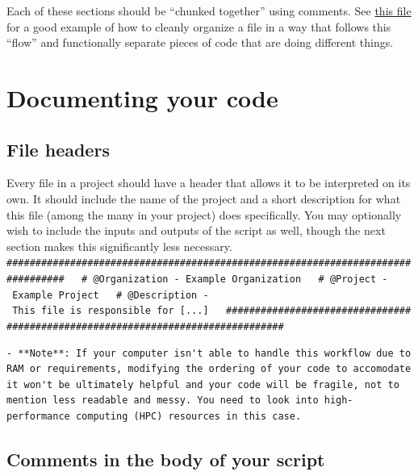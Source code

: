 \documentclass[]{book}
\begin{document}
Each of these sections should be ``chunked together'' using comments. See \href{https://github.com/kmishra9/Flu-Absenteeism/blob/master/Master's\%20Thesis\%20-\%20Spatial\%20Epidemiology\%20of\%20Influenza/2a\%20-\%20Statistical-Inputs.R}{this file} for a good example of how to cleanly organize a file in a way that follows this ``flow'' and functionally separate pieces of code that are doing different things.

\hypertarget{documenting-your-code}{%
\section{Documenting your code}\label{documenting-your-code}}

\hypertarget{file-headers}{%
\subsection{File headers}\label{file-headers}}

Every file in a project should have a header that allows it to be interpreted on its own. It should include the name of the project and a short description for what this file (among the many in your project) does specifically. You may optionally wish to include the inputs and outputs of the script as well, though the next section makes this significantly less necessary.
\texttt{\#\#\#\#\#\#\#\#\#\#\#\#\#\#\#\#\#\#\#\#\#\#\#\#\#\#\#\#\#\#\#\#\#\#\#\#\#\#\#\#\#\#\#\#\#\#\#\#\#\#\#\#\#\#\#\#\#\#\#\#\#\#\#\#\#\#\#\#\#\#\#\#\#\#\#\#\#\#\#\#\ \ \ \#\ @Organization\ -\ Example\ Organization\ \ \ \#\ @Project\ -\ Example\ Project\ \ \ \#\ @Description\ -\ This\ file\ is\ responsible\ for\ {[}...{]}\ \ \ \#\#\#\#\#\#\#\#\#\#\#\#\#\#\#\#\#\#\#\#\#\#\#\#\#\#\#\#\#\#\#\#\#\#\#\#\#\#\#\#\#\#\#\#\#\#\#\#\#\#\#\#\#\#\#\#\#\#\#\#\#\#\#\#\#\#\#\#\#\#\#\#\#\#\#\#\#\#\#\#}

\begin{verbatim}
- **Note**: If your computer isn't able to handle this workflow due to RAM or requirements, modifying the ordering of your code to accomodate it won't be ultimately helpful and your code will be fragile, not to mention less readable and messy. You need to look into high-performance computing (HPC) resources in this case.
\end{verbatim}

\hypertarget{comments-in-the-body-of-your-script}{%
\subsection{Comments in the body of your script}\label{comments-in-the-body-of-your-script}}
\end{document}
